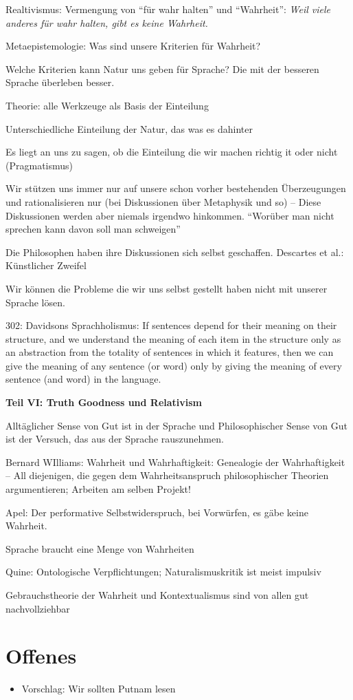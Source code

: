 \documentclass[a4paper, emulatestandardclasses]{scrartcl}
\begin{document}
Realtivismus: Vermengung von "`für wahr halten"' und "`Wahrheit"': \emph{Weil viele anderes für wahr halten, gibt es keine Wahrheit.}

Metaepistemologie: Was sind unsere Kriterien für Wahrheit? 

Welche Kriterien kann Natur uns geben für Sprache? Die mit der besseren Sprache überleben besser. 


Theorie: alle Werkzeuge als Basis der Einteilung 

Unterschiedliche Einteilung der Natur, das was es dahinter

Es liegt an uns zu sagen, ob die Einteilung die wir machen richtig it oder nicht (Pragmatismus)

Wir stützen uns immer nur auf unsere schon vorher bestehenden Überzeugungen und rationalisieren nur (bei Diskussionen über Metaphysik und so) -- Diese Diskussionen werden aber niemals irgendwo hinkommen. "`Worüber man nicht sprechen kann davon soll man schweigen"'

Die Philosophen haben ihre Diskussionen sich selbst geschaffen. Descartes et al.: Künstlicher Zweifel

Wir können die Probleme die wir uns selbst gestellt haben nicht mit unserer Sprache lösen.

302: Davidsons Sprachholismus: If sentences depend for their meaning on their structure, and we understand the meaning of each item in the structure only as an abstraction from the totality of sentences in which it features, then we can give the meaning of any sentence (or word) only by giving the meaning of every sentence (and word) in the language.


\noindent\textbf{Teil VI: Truth Goodness und Relativism}

Alltäglicher Sense von Gut ist in der Sprache und Philosophischer Sense von Gut ist der Versuch, das aus der Sprache rauszunehmen. 

Bernard WIlliams: Wahrheit und Wahrhaftigkeit: Genealogie der Wahrhaftigkeit -- All diejenigen, die gegen dem Wahrheitsanspruch philosophischer Theorien argumentieren; Arbeiten am selben Projekt!

Apel: Der performative Selbstwiderspruch, bei Vorwürfen, es gäbe keine Wahrheit.

Sprache braucht eine Menge von Wahrheiten

Quine: Ontologische Verpflichtungen; Naturalismuskritik ist meist impulsiv


Gebrauchstheorie der Wahrheit und Kontextualismus sind von allen gut nachvollziehbar

\section*{Offenes}

\begin{itemize}
  \item Vorschlag: Wir sollten Putnam lesen 
\end{itemize}
\end{document}
